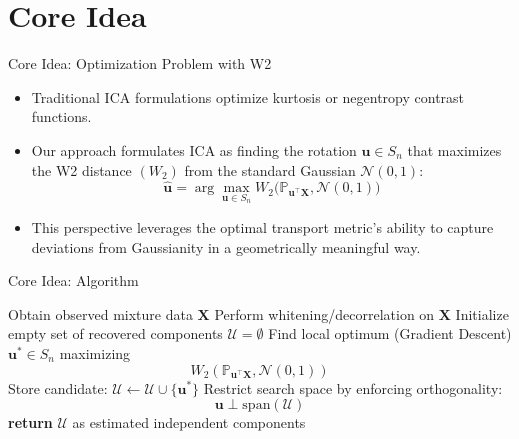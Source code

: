 \documentclass{beamer}
\begin{document}
\section{Core Idea}

\begin{frame}{Core Idea: Optimization Problem with W2}
\begin{itemize}
    \item Traditional ICA formulations optimize kurtosis or negentropy contrast functions.
    \item Our approach formulates ICA as finding the rotation \(\mathbf{u} \in S_n\) that maximizes the W2 distance \((W_2)\) from the standard Gaussian \(\mathcal{N}(0,1)\):
    \[
        \hat{\mathbf{u}} = \arg\max_{\mathbf{u} \in S_n} W_2\big(\mathbb{P}_{\mathbf{u}^\top \mathbf{X}}, \mathcal{N}(0,1)\big)
    \]
    \item This perspective leverages the optimal transport metric's ability to capture deviations from Gaussianity in a geometrically meaningful way.
\end{itemize}
\end{frame}


\begin{frame}{Core Idea: Algorithm}
\begin{algorithm}[H]
\caption{ICA with W2 Distance Optimization}
\begin{algorithmic}[1]
\State Obtain observed mixture data \(\mathbf{X}\)
\State Perform whitening/decorrelation on \(\mathbf{X}\)
\State Initialize empty set of recovered components \(\mathcal{U} = \emptyset\)
    \State Find local optimum (Gradient Descent) \(\mathbf{u}^* \in S_n\) maximizing
    \[
        W_2\left(\mathbb{P}_{\mathbf{u}^\top \mathbf{X}}, \mathcal{N}(0,1)\right)
    \]
    \State Store candidate: \(\mathcal{U} \leftarrow \mathcal{U} \cup \{\mathbf{u}^*\}\)
    \State Restrict search space by enforcing orthogonality:
    \[
        \mathbf{u} \perp \mathrm{span}(\mathcal{U})
    \]
\EndWhile
\State \textbf{return} \(\mathcal{U}\) as estimated independent components
\end{algorithmic}
\end{algorithm}
\end{frame}



\end{document}
